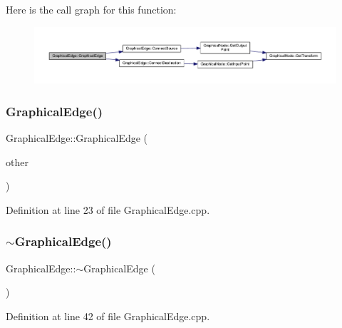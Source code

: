 Here is the call graph for this function\+:
\nopagebreak
\begin{figure}[H]
\begin{center}
\leavevmode
\includegraphics[width=350pt]{class_graphical_edge_af8c31162129b7c33427de769beaed38d_cgraph}
\end{center}
\end{figure}
\mbox{\label{class_graphical_edge_a50ac3c64f7c8d259d5905802a1808aa6}} 
\subsubsection{\texorpdfstring{Graphical\+Edge()}{GraphicalEdge()}\hspace{0.1cm}{\footnotesize\ttfamily [4/4]}}
{\footnotesize\ttfamily Graphical\+Edge\+::\+Graphical\+Edge (\begin{DoxyParamCaption}\item[{const \hyperlink{class_graphical_edge}{Graphical\+Edge} \&}]{other }\end{DoxyParamCaption})}



Definition at line 23 of file Graphical\+Edge.\+cpp.

\mbox{\label{class_graphical_edge_ac19b4561ff4274f8fbbc6700a86b2f27}} 
\subsubsection{\texorpdfstring{$\sim$\+Graphical\+Edge()}{~GraphicalEdge()}}
{\footnotesize\ttfamily Graphical\+Edge\+::$\sim$\+Graphical\+Edge (\begin{DoxyParamCaption}{ }\end{DoxyParamCaption})}



Definition at line 42 of file Graphical\+Edge.\+cpp.

